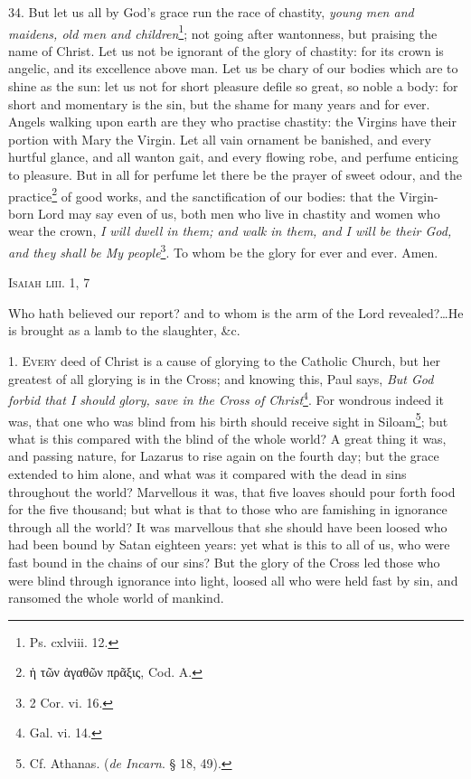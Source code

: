 34. But let us all by God’s grace run the race of chastity, \emph{young men and maidens, old men and children}\footnote{Ps. cxlviii. 12.}; not going after wantonness, but praising the name of Christ. Let us not be ignorant of the glory of chastity: for its crown is angelic, and its excellence above man. Let us be chary of our bodies which are to shine as the sun: let us not for short pleasure defile so great, so noble a body: for short and momentary is the sin, but the shame for many years and for ever. Angels walking upon earth are they who practise chastity: the Virgins have their portion with Mary the Virgin. Let all vain ornament be banished, and every hurtful glance, and all wanton gait, and every flowing robe, and perfume enticing to pleasure. But in all for perfume let there be the prayer of sweet odour, and the practice\footnote{\textgreek{ἡ τῶν ἀγαθῶν πρᾶξις}, Cod. A.} of good works, and the sanctification of our bodies: that the Virgin-born Lord may say even of us, both men who live in chastity and women who wear the crown, \emph{I will dwell in them; and walk in them, and I will be their God, and they shall be My people}\footnote{2 Cor. vi. 16.}. To whom be the glory for ever and ever. Amen.


\textsc{Isaiah liii. 1, 7}

Who hath believed our report? and to whom is the arm of the Lord revealed?…He is brought as a lamb to the slaughter, \&c.

1. \textsc{Every} deed of Christ is a cause of glorying to the Catholic Church, but her greatest of all glorying is in the Cross; and knowing this, Paul says, \emph{But God forbid that I should glory, save in the Cross of Christ}\footnote{Gal. vi. 14.}. For wondrous indeed it was, that one who was blind from his birth should receive sight in Siloam\footnote{Cf. Athanas. (\emph{de Incarn}. § 18, 49).}; but what is this compared with the blind of the whole world? A great thing it was, and passing nature, for Lazarus to rise again on the fourth day; but the grace extended to him alone, and what was it compared with the dead in sins throughout the world? Marvellous it was, that five loaves should pour forth food for the five thousand; but what is that to those who are famishing in ignorance through all the world? It was marvellous that she should have been loosed who had been bound by Satan eighteen years: yet what is this to all of us, who were fast bound in the chains of our sins? But the glory of the Cross led those who were blind through ignorance into light, loosed all who were held fast by sin, and ransomed the whole world of mankind.


